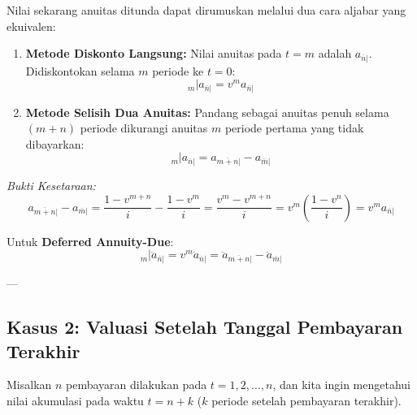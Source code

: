 \documentclass[11pt,a4paper]{article}
\begin{document}
Nilai sekarang anuitas ditunda dapat dirumuskan melalui dua cara aljabar yang ekuivalen:
\begin{enumerate}[label=\alph*.]
    \item \textbf{Metode Diskonto Langsung:} Nilai anuitas pada $t = m$ adalah $a_{\overline{n}|}$. Didiskontokan selama $m$ periode ke $t = 0$:
    \begin{equation}
        {}_m| a_{\overline{n}|} = v^m a_{\overline{n}|}
    \end{equation}
    
    \item \textbf{Metode Selisih Dua Anuitas:} Pandang sebagai anuitas penuh selama $(m+n)$ periode dikurangi anuitas $m$ periode pertama yang tidak dibayarkan:
    \begin{equation}
        {}_m| a_{\overline{n}|} = a_{\overline{m+n}|} - a_{\overline{m}|}
    \end{equation}
\end{enumerate}

\textit{Bukti Kesetaraan:}
\begin{equation*}
    a_{\overline{m+n}|} - a_{\overline{m}|} = \frac{1 - v^{m+n}}{i} - \frac{1 - v^m}{i} = \frac{v^m - v^{m+n}}{i} = v^m \left(\frac{1 - v^n}{i}\right) = v^m a_{\overline{n}|}
\end{equation*}

Untuk \textbf{Deferred Annuity-Due}:
\begin{equation}
    {}_m| \ddot{a}_{\overline{n}|} = v^m \ddot{a}_{\overline{n}|} = \ddot{a}_{\overline{m+n}|} - \ddot{a}_{\overline{m}|}
\end{equation}

---

\subsection{Kasus 2: Valuasi Setelah Tanggal Pembayaran Terakhir}

Misalkan $n$ pembayaran dilakukan pada $t = 1, 2, \dots, n$, dan kita ingin mengetahui nilai akumulasi pada waktu $t = n + k$ ($k$ periode setelah pembayaran terakhir).
\end{document}

